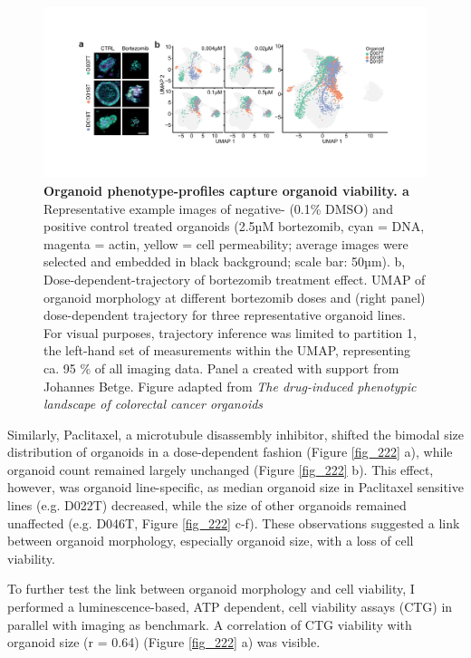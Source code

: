 \begin{flushleft}
\begin{figure}[h]
\centering
\includegraphics[width=\textwidth,
                height=\textheight,
                keepaspectratio]{figures/promise/pdf/fig_2_1.pdf}
\caption[Organoid phenotype-profiles capture organoid viability]{\textbf{Organoid phenotype-profiles capture organoid viability. a} Representative example images of negative- (0.1\% DMSO) and positive control treated organoids (2.5µM bortezomib, cyan = DNA, magenta = actin, yellow = cell permeability; average images were selected and embedded in black background; scale bar: 50µm). b, Dose-dependent-trajectory of bortezomib treatment effect. UMAP of organoid morphology at different bortezomib doses and (right panel) dose-dependent trajectory for three representative organoid lines. For visual purposes, trajectory inference was limited to partition 1, the left-hand set of measurements within the UMAP, representing ca. 95 \% of all imaging data. Panel a created with support from Johannes Betge. Figure adapted from \textit{The drug-induced phenotypic landscape of colorectal cancer organoids} \cite{Betge2022-kr}}
\label{fig_221}
\end{figure}
\bigbreak

Similarly, Paclitaxel, a microtubule disassembly inhibitor, shifted the bimodal size distribution of organoids in a dose-dependent fashion (Figure \ref{fig_222} a), while organoid count remained largely unchanged (Figure \ref{fig_222} b). This effect, however, was organoid line-specific, as median organoid size in Paclitaxel sensitive lines (e.g. D022T) decreased, while the size of other organoids remained unaffected (e.g. D046T, Figure \ref{fig_222} c-f). These observations suggested a link between organoid morphology, especially organoid size, with a loss of cell viability. 

\bigbreak
To further test the link between organoid morphology and cell viability, I performed a luminescence-based, ATP dependent, cell viability assays (CTG) in parallel with imaging as benchmark. A correlation of CTG viability with organoid size (r = 0.64) (Figure \ref{fig_222} a) was visible. 


\end{flushleft}
